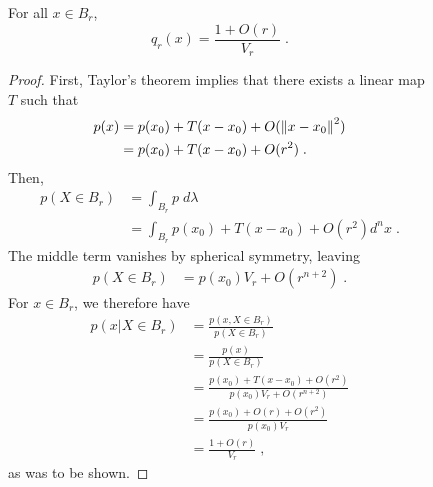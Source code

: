 \documentclass[english]{scrartcl}
\begin{document}
\begin{figure}
	\begin{lm}
		For all $x \in B_r$,  
		\begin{equation*}
			q_r(x) = \frac{1 + O(r)}{V_r}\;.	
		\end{equation*}
	\end{lm}
	\begin{proof}
		First, Taylor's theorem implies that there exists a linear map $T$ such that 
		\begin{align*}
			p(x) &= p(x_0) + T(x - x_0) + O(\left\lVert x - x_0\right\rVert^2) \\
			&= p(x_0) + T(x - x_0) + O(r^2)\;. 
		\end{align*}
		 Then, 
		\begin{align*}
			p(X\in B_r) &= \int_{B_r} p \; d\lambda \\
			&= \int_{B_r} p(x_0) + T(x - x_0) + O(r^2) d^n x\;.
		\end{align*}
		The middle term vanishes by spherical symmetry, leaving 
		\begin{align*}
			p(X\in B_r) &= p(x_0)V_r  + O(r^{n+2})\;.
		\end{align*}
		For $x \in B_r$, we therefore have 
		\begin{align*}
			p(x|X \in B_r) &= \frac{p(x,X \in B_r)}{p(X \in B_r)} \\ 
			&= \frac{p(x)}{p(X \in B_r)} \\
			&= \frac{p(x_0) + T(x - x_0) + O(r^2)}{p(x_0)V_r  + O(r^{n+2})} \\
			&= \frac{p(x_0) + O(r) + O(r^2)}{p(x_0)V_r} \\
			&= \frac{1 + O(r)}{V_r}\;,
		\end{align*}
		as was to be shown. 
	\end{proof}


\end{figure}
\end{document}
